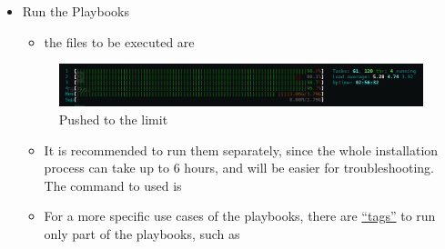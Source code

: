 \begin{itemize}
\item
  Run the Playbooks

  \begin{itemize}
  \tightlist
  \item
    the files to be executed are
  \end{itemize}

\begin{Shaded}
\begin{Highlighting}[]

\end{Highlighting}
\end{Shaded}

  \begin{figure}
  \centering
  \includegraphics{./media/2_pushedToLimit.png}
  \caption{Pushed to the limit}
  \end{figure}

  \begin{itemize}
  \tightlist
  \item
    It is recommended to run them separately, since the whole
    installation process can take up to 6 hours, and will be easier for
    troubleshooting. The command to used is
  \end{itemize}

\begin{Shaded}
\begin{Highlighting}[]
\ExtensionTok{$}\OperatorTok{\textless{}}\OperatorTok{\textgreater{}}
\end{Highlighting}
\end{Shaded}

  \begin{itemize}
  \tightlist
  \item
    For a more specific use cases of the playbooks, there are
    \href{https://andresrcs.rbind.io/2021/01/13/raspberry_pi_server/\#run-the-playbooks}{``tags''}
    to run only part of the playbooks, such as
  \end{itemize}


\end{itemize}
